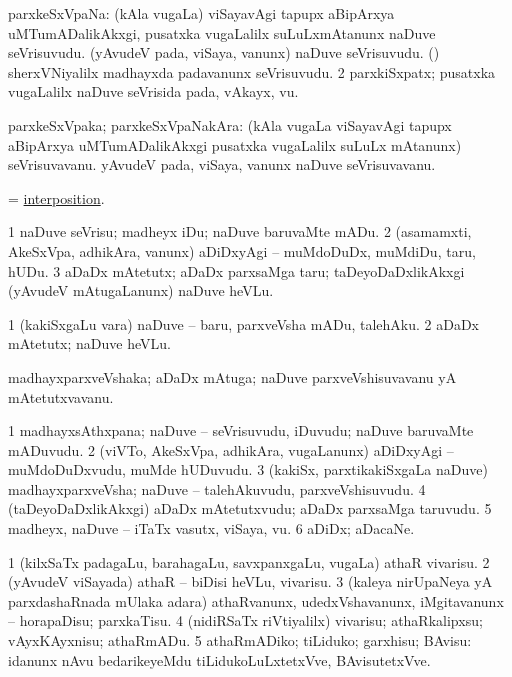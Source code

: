 \bentry
{}
\gl{\nA}
\bmng
\bnum
{} parxkeSxVpaNa: 
\banum
{} (kAla \mo vugaLa) viSayavAgi tapupx aBipArxya uMTumADalikAkxgi, pusatxka \mo vugaLalilx suLuLxmAtanunx naDuve seVrisuvudu. 
 (yAvudeV pada, viSaya, \mo vanunx) naDuve seVrisuvudu. 
 (\ga) sherxVNiyalilx madhayxda padavanunx seVrisuvudu. 
\eanum
\numie
\num{2} parxkiSxpatx; pusatxka \mo vugaLalilx naDuve seVrisida pada, vAkayx, \mo vu. 
\enum
\emng
\eentry

\bentry
{}
\gl{\nA}
\bmng
parxkeSxVpaka; parxkeSxVpaNakAra: 
\banum
{} (kAla \mo vugaLa viSayavAgi tapupx aBipArxya uMTumADalikAkxgi pusatxka \mo vugaLalilx suLuLx mAtanunx) seVrisuvavanu. 
 yAvudeV pada, viSaya, \mo vanunx naDuve seVrisuvavanu. 
\eanum
\emng
\eentry

\bentry
{}
\gl{\nA}
\bmng
 =  \hyperlink{interposition}{interposition}. 
\emng
\eentry

\bentry
{}
\gl{\sakirx}
\bmng
\bnum
\num{1} naDuve seVrisu; madheyx iDu; naDuve baruvaMte mADu. 
\num{2} (asamamxti, AkeSxVpa, adhikAra, \mo vanunx) aDiDxyAgi -- muMdoDuDx, muMdiDu, taru, hUDu. 
\num{3} aDaDx mAtetutx; aDaDx parxsaMga taru; taDeyoDaDxlikAkxgi (yAvudeV mAtugaLanunx) naDuve heVLu. 
\enum
\emng

\noindent 
\gl{\akirx}
\bmng
\bnum
\num{1} (kakiSxgaLu \mo vara) naDuve -- baru, parxveVsha mADu, talehAku. 
\num{2} aDaDx mAtetutx; naDuve heVLu. 
\enum
\emng
\eentry

\bentry 
{}
\gl{\nA}
\bmng
madhayxparxveVshaka; aDaDx mAtuga; naDuve parxveVshisuvavanu yA mAtetutxvavanu. 
\emng
\eentry

\bentry
{}
\gl{\nA}
\bmng
\bnum
\num{1} madhayxsAthxpana; naDuve -- seVrisuvudu, iDuvudu; naDuve baruvaMte mADuvudu. 
\num{2} (viVTo, AkeSxVpa, adhikAra, \mo vugaLanunx) aDiDxyAgi -- muMdoDuDxvudu, muMde hUDuvudu. 
\num{3} (kakiSx, parxtikakiSxgaLa naDuve) madhayxparxveVsha; naDuve -- talehAkuvudu, parxveVshisuvudu. 
\num{4} (taDeyoDaDxlikAkxgi) aDaDx mAtetutxvudu; aDaDx parxsaMga taruvudu. 
\num{5} madheyx, naDuve -- iTaTx vasutx, viSaya, \mo vu. 
\num{6} aDiDx; aDacaNe. 
\enum
\emng
\eentry

\bentry
{}
\gl{\sakirx}
\bmng
\bnum
\num{1} (kilxSaTx padagaLu, barahagaLu, savxpanxgaLu, \mo vugaLa) athaR vivarisu. 
\num{2} (yAvudeV viSayada) athaR -- biDisi heVLu, vivarisu. 
\num{3} (kaleya nirUpaNeya yA parxdashaRnada mUlaka adara) athaRvanunx, udedxVshavanunx, iMgitavanunx -- horapaDisu; parxkaTisu. 
\num{4} (nidiRSaTx riVtiyalilx) vivarisu; athaRkalipxsu; vAyxKAyxnisu; athaRmADu. 
\num{5} athaRmADiko; tiLiduko; garxhisu; BAvisu:  idanunx nAvu bedarikeyeMdu tiLidukoLuLxtetxVve, BAvisutetxVve. 
\enum
\emng

